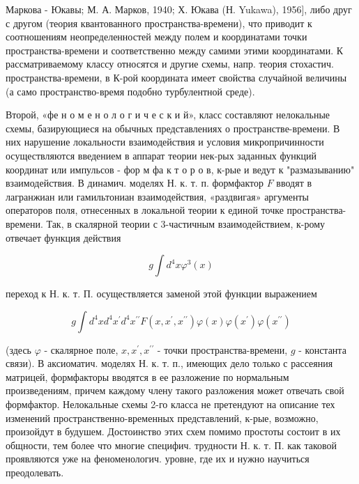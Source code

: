 \documentclass[10pt]{article}
\begin{document}
Маркова - Юкавы; М. А. Марков, 1940; Х. Юкава (Н. Yukawa), 1956], либо друг с другом (теория квантованного пространства-времени), что приводит к соотношениям неопределенностей между полем и координатами точки пространства-времени и соответственно между самими этими координатами. К рассматриваемому классу относятся и другие схемы, напр. теория стохастич. пространства-времени, в К-рой координата имеет свойства случайной величины (а само пространство-время подобно турбулентной среде).



Второй, «фе н о м е н о л о г и ч е с к и й», класс составляют нелокальные схемы, базирующиеся на обычных представлениях о пространстве-времени. В них нарушение локальности взаимодействия и условия микропричинности осуществляются введением в аппарат теории нек-рых заданных функций координат или импульсов - фор м фа к т о р о в, к-рые и ведут к "размазыванию" взаимодействия. В динамич. моделях Н. к. т. п. формфактор $F$ вводят в лагранжиан или гамильтониан взаимодействия, «раздвигая» аргументы операторов поля, отнесенных в локальной теории к единой точке пространства-времени. Так, в скалярной теории с 3-частичным взаимодействием, к-рому отвечает функция действия



\[

g \int d^{4} x \varphi^{3}(x)

\]



переход к Н. к. т. П. осуществляется заменой этой функции выражением



\[

g \int d^{4} x d^{4} x^{\prime} d^{4} x^{\prime \prime} F\left(x, x^{\prime}, x^{\prime \prime}\right) \varphi(x) \varphi\left(x^{\prime}\right) \varphi\left(x^{\prime \prime}\right)

\]



(здесь $\varphi$ - скалярное поле, $x, x^{\prime}, x^{\prime \prime}$ - точки пространства-времени, $g$ - константа связи). В аксиоматич. моделях Н. к. т. п., имеющих дело только с рассеяния матрицей, формфакторы вводятся в ее разложение по нормальным произведениям, причем каждому члену такого разложения может отвечать свой формфактор. Нелокальные схемы 2-го класса не претендуют на описание тех изменений пространственно-временных представлений, к-рые, возможно, произойдут в будушем. Достоинство этих схем помимо простоты состоит в их общности, тем более что многие специфич. трудности Н. к. т. П. как таковой проявляются уже на феноменологич. уровне, где их и нужно научиться преодолевать.
\end{document}
